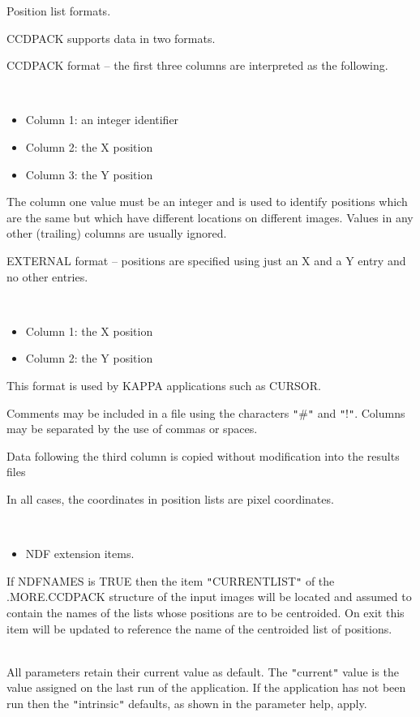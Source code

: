\documentclass[twoside,11pt]{article}
\newcommand{\xref}[3]{#1}
\renewcommand{\_}{\texttt{\symbol{95}}}
\newcommand{\qt}[1]{{\tt "}#1{\tt "}}
\newcommand{\sstdiytopic}[2]{\item[#1:] \mbox{} \\[1.3ex] #2}
\newcommand{\sstitemlist}[1]{
  \mbox{} \\
  \vspace{-3.5ex}
  \begin{itemize}
     #1
  \end{itemize}
}
\newcommand{\sstitem}{\item}
\newcommand{\sstdiytopic}[2]{\item[{#1}] #2 }
\newcommand{\sstitemlist}[1]{
      \begin{itemize}
         #1
      \end{itemize}
      \\
   }
\newcommand{\sstitem}{\item}
\begin{document}
{{{         \sstitem
         Position list formats.

      }
        CCDPACK supports data in two formats.

        CCDPACK format -- the first three columns are interpreted as the
        following.

      \sstitemlist{

         \sstitem
              Column 1: an integer identifier

         \sstitem
              Column 2: the X position

         \sstitem
              Column 3: the Y position

      }
        The column one value must be an integer and is used to identify
        positions which are the same but which have different locations
        on different images. Values in any other (trailing) columns are
        usually ignored.

        EXTERNAL format -- positions are specified using just an X and
        a Y entry and no other entries.

      \sstitemlist{

         \sstitem
              Column 1: the X position

         \sstitem
              Column 2: the Y position

      }
        This format is used by KAPPA applications such as
        \xref{CURSOR}{sun95}{CURSOR}.

        Comments may be included in a file using the characters \qt{\#} and
        \qt{!}. Columns may be separated by the use of commas or spaces.

        Data following the third column is copied without modification
        into the results files

        In all cases, the coordinates in position lists are pixel 
        coordinates.

      \sstitemlist{

         \sstitem
         NDF extension items.

      }
        If NDFNAMES is TRUE then the item \qt{CURRENT\_LIST} of the
        .MORE.CCDPACK structure of the input images will be located
        and assumed to contain the names of the lists whose positions
        are to be centroided. On exit this item will be updated to
        reference the name of the centroided list of positions.
   }
   \sstdiytopic{
      Behaviour of parameters
   } {
      All parameters retain their current value as default. The
      \qt{current} value is the value assigned on the last run of the
      application. If the application has not been run then the
      \qt{intrinsic} defaults, as shown in the parameter help, apply.

}}
\end{document}
